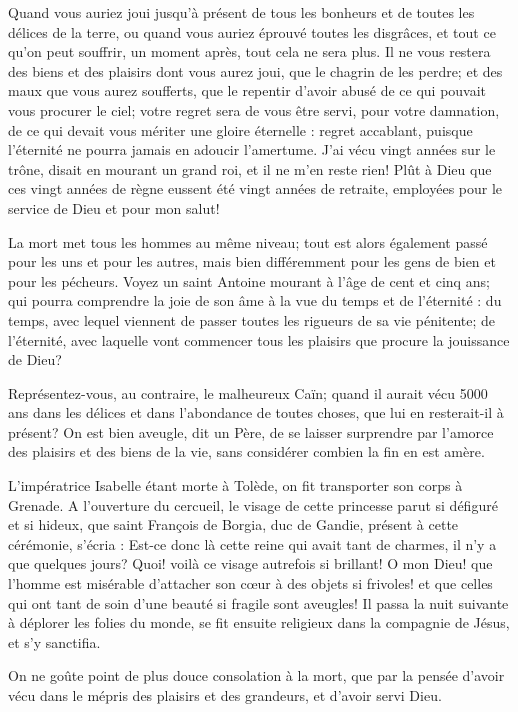 \documentclass[instructions.tex]{subfiles}
\begin{document}
Quand vous auriez joui jusqu’à présent de tous les bonheurs et de toutes les délices de la terre, ou quand vous auriez éprouvé toutes les disgrâces, et tout ce qu’on peut souffrir, un moment après, tout cela ne sera plus. Il ne vous restera des biens et des plaisirs dont vous aurez joui, que le chagrin de les perdre; et des maux que vous aurez soufferts, que le repentir d’avoir abusé de ce qui pouvait vous procurer le ciel; votre regret sera de vous être servi, pour votre damnation, de ce qui devait vous mériter une gloire éternelle : regret accablant, puisque l’éternité ne pourra jamais en adoucir l’amertume. J’ai vécu vingt années sur le trône, disait en mourant un grand roi, et il ne m’en reste rien! Plût à Dieu que ces vingt années de règne eussent été vingt années de retraite, employées pour le service de Dieu et pour mon salut!
 
\secundo La mort met tous les hommes au même niveau; tout est alors également passé pour les uns et pour les autres, mais bien différemment pour les gens de bien et pour les pécheurs. Voyez un saint Antoine mourant à l’âge de cent et cinq ans; qui pourra comprendre la joie de son âme à la vue du temps et de l’éternité : du temps, avec lequel viennent de passer toutes les rigueurs de sa vie pénitente; de l’éternité, avec laquelle vont commencer tous les plaisirs que procure la jouissance de Dieu?
 
Représentez-vous, au contraire, le malheureux Caïn; quand il aurait vécu 5000 ans dans les délices et dans l’abondance de toutes choses, que lui en resterait-il à présent? On est bien aveugle, dit un Père, de se laisser surprendre par l’amorce des plaisirs et des biens de la vie, sans considérer combien la fin en est amère.
 
L’impératrice Isabelle étant morte à Tolède, on fit transporter son corps à Grenade. A l’ouverture du cercueil, le visage de cette princesse parut si défiguré et si hideux, que saint François de Borgia, duc de Gandie, présent à cette cérémonie, s’écria : Est-ce donc là cette reine qui avait tant de charmes, il n’y a que quelques jours? Quoi! voilà ce visage autrefois si brillant! O mon Dieu! que l’homme est misérable d’attacher son cœur à des objets si frivoles! et que celles qui ont tant de soin d’une beauté si fragile sont aveugles! Il passa la nuit suivante à déplorer les folies du monde, se fit ensuite religieux dans la compagnie de Jésus, et s’y sanctifia.
 
On ne goûte point de plus douce consolation à la mort, que par la pensée d’avoir vécu dans le mépris des plaisirs et des grandeurs, et d’avoir servi Dieu.
 
\end{document}
